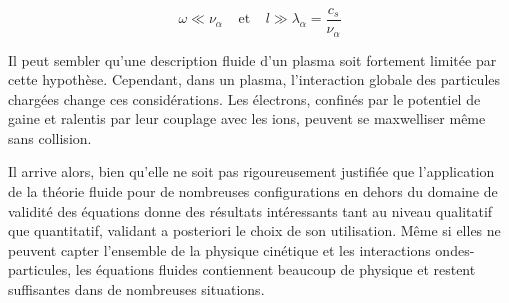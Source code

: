 \begin{refsection}
\begin{equation}
\omega\ll \nu_{\alpha}
\;\;\;\;\text{et}\;\;\;\;l\gg\lambda_\alpha=\frac{c_s}{\nu_\alpha}
\end{equation}

Il peut sembler qu'une description fluide d'un plasma soit fortement limitée par
cette hypothèse. Cependant, dans un plasma, l'interaction globale des
particules chargées change ces considérations.
Les électrons, confinés par le potentiel de gaine et ralentis par leur
couplage avec les ions, peuvent se maxwelliser même sans collision. 

Il arrive alors, bien qu'elle ne soit pas rigoureusement justifiée
que l'application de la théorie fluide pour de nombreuses configurations en
dehors du domaine de validité des équations donne des résultats
intéressants tant au niveau qualitatif que quantitatif, validant a posteriori
le choix de son utilisation.
Même si elles ne peuvent capter l'ensemble de la
physique cinétique et les interactions ondes-particules, les équations fluides
contiennent beaucoup de physique et restent suffisantes dans de nombreuses
situations.


\end{refsection}

